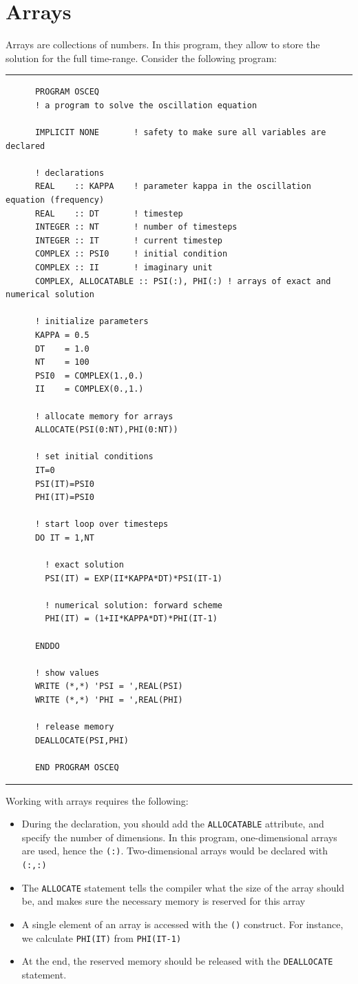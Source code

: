 \documentclass[a4paper]{article}
\begin{document}
\section{Arrays}
%
\par
Arrays are collections of numbers. In this program, they allow to store the solution for the full time-range. Consider the following program:
%
{\vspace{10pt}\hrule\small\vspace*{-2pt}\begin{verbatim}
	  PROGRAM OSCEQ
	  ! a program to solve the oscillation equation

	  IMPLICIT NONE       ! safety to make sure all variables are declared

	  ! declarations
	  REAL    :: KAPPA    ! parameter kappa in the oscillation equation (frequency)
	  REAL    :: DT       ! timestep
	  INTEGER :: NT       ! number of timesteps
	  INTEGER :: IT       ! current timestep
	  COMPLEX :: PSI0     ! initial condition
	  COMPLEX :: II       ! imaginary unit
	  COMPLEX, ALLOCATABLE :: PSI(:), PHI(:) ! arrays of exact and numerical solution

	  ! initialize parameters
	  KAPPA = 0.5
	  DT    = 1.0
	  NT    = 100
	  PSI0  = COMPLEX(1.,0.)
	  II    = COMPLEX(0.,1.)

	  ! allocate memory for arrays
	  ALLOCATE(PSI(0:NT),PHI(0:NT))

	  ! set initial conditions
	  IT=0
	  PSI(IT)=PSI0
	  PHI(IT)=PSI0

	  ! start loop over timesteps
	  DO IT = 1,NT
	  	
	  	! exact solution
	  	PSI(IT) = EXP(II*KAPPA*DT)*PSI(IT-1)
	  	
	  	! numerical solution: forward scheme
	  	PHI(IT) = (1+II*KAPPA*DT)*PHI(IT-1)
	  	
	  ENDDO

	  ! show values
	  WRITE (*,*) 'PSI = ',REAL(PSI)
	  WRITE (*,*) 'PHI = ',REAL(PHI)

	  ! release memory
	  DEALLOCATE(PSI,PHI)

	  END PROGRAM OSCEQ
\end{verbatim}\hrule\vspace{5pt}}
%
\par
Working with arrays requires the following:
%
\begin{itemize}
	\item During the declaration, you should add the \verb+ALLOCATABLE+ attribute, and specify the number of dimensions. In this program, one-dimensional arrays are used, hence the \verb+(:)+. Two-dimensional arrays would be declared with \verb+(:,:)+
	\item The \verb+ALLOCATE+ statement tells the compiler what the size of the array should be, and makes sure the necessary memory is reserved for this array
	\item A single element of an array is accessed with the \verb+()+ construct. For instance, we calculate \verb+PHI(IT)+ from \verb+PHI(IT-1)+
	\item At the end, the reserved memory should be released with the \verb+DEALLOCATE+ statement.
\end{itemize}
\end{document}
